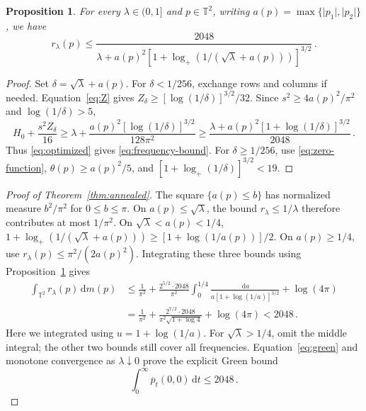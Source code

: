 \documentclass[11pt]{amsart}
\theoremstyle{plain}
\newtheorem{proposition}[theorem]{Proposition}
\theoremstyle{definition}
\newcommand{\T}{\mathbb T}
\newcommand{\1}{\mathbf 1}
\newcommand{\abs}[1]{\lvert #1\rvert}
\newcommand{\dd}{\,\mathrm d}
\begin{document}
	\begin{proposition}\label{prop:frequency}
		For every
		$\lambda\in(0,1]$ and $p\in\T^2$, writing
		$a(p)=\max\{\abs{p_1},\abs{p_2}\}$, we have
		\begin{equation}\label{eq:frequency-bound}
			r_\lambda(p)\leq
			\frac{2048}{\lambda+a(p)^2
				[1+\log_+(1/(\sqrt\lambda+a(p)))]^{3/2}}\, .
		\end{equation}
	\end{proposition}
	
	\begin{proof}
		Set $\delta=\sqrt\lambda+a(p)$.
		For $\delta<1/256$, exchange rows and columns if needed.
		Equation~\eqref{eq:Z} gives $Z_\delta\geq[\log(1/\delta)]^{3/2}/32$.
		Since $s^2\geq4a(p)^2/\pi^2$ and $\log(1/\delta)>5$,
		\[
		H_0+\frac{s^2Z_\delta}{16}
		\geq\lambda+\frac{a(p)^2[\log(1/\delta)]^{3/2}}{128\pi^2}
		\geq\frac{\lambda+a(p)^2[1+\log(1/\delta)]^{3/2}}{2048}\, .
		\]
		Thus \eqref{eq:optimized} gives \eqref{eq:frequency-bound}.
		For $\delta\geq1/256$, use \eqref{eq:zero-function},
		$\theta(p)\geq a(p)^2/5$, and
		$[1+\log_+(1/\delta)]^{3/2}<19$.
	\end{proof}
	
	\begin{proof}[Proof of Theorem~\ref{thm:annealed}]
		The square $\{a(p)\leq b\}$ has normalized measure $b^2/\pi^2$ for
		$0\leq b\leq\pi$.  On $a(p)\leq\sqrt\lambda$, the bound
		$r_\lambda\leq1/\lambda$ therefore contributes at most $1/\pi^2$.
		On $\sqrt\lambda<a(p)<1/4$,
		$1+\log_+(1/(\sqrt\lambda+a(p)))\geq[1+\log(1/a(p))]/2$.
		On $a(p)\geq1/4$, use $r_\lambda(p)\leq\pi^2/(2a(p)^2)$.
		Integrating these three bounds using Proposition~\ref{prop:frequency} gives
		\begin{align*}
			\int_{\T^2}r_\lambda(p)\dd m(p)
			&\leq\frac1{\pi^2}
			+\frac{2^{5/2}\cdot2048}{\pi^2}
			\int_0^{1/4}\frac{\dd a}{a[1+\log(1/a)]^{3/2}}+\log(4\pi)\\
			&=\frac1{\pi^2}
			+\frac{2^{7/2}\cdot2048}{\pi^2\sqrt{1+\log4}}+\log(4\pi)
			<2048\, .
		\end{align*}
		Here we integrated using $u=1+\log(1/a)$.
		For $\sqrt\lambda>1/4$, omit the middle integral; the other two bounds
		still cover all frequencies.  Equation~\eqref{eq:green} and monotone convergence
		as $\lambda\downarrow0$ prove the explicit Green bound
		\begin{equation}\label{eq:green-explicit}
			\int_0^\infty\overline p_t(0,0)\dd t\leq2048\, .
		\end{equation}
	\end{proof}
	
\end{document}
